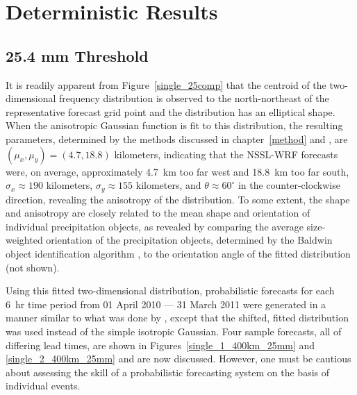 

\section{Deterministic Results}
\label{dresults}


\subsection{25.4 mm Threshold}
\label{dresults_25.4mm}

It is readily apparent from \mbox{Figure \ref{single_25comp}} that the centroid of the two-dimensional frequency distribution is observed to the north-northeast of the representative forecast grid point and the distribution has an elliptical shape.
When the anisotropic Gaussian function is fit to this distribution, the resulting parameters, determined by the methods discussed in \mbox{chapter \ref{method}} and \cite{Lak2010}, are $(\mu_x, \mu_y) = (4.7, 18.8)$ kilometers, indicating that the NSSL-WRF forecasts were, on average, approximately \mbox{4.7 km} too far west and \mbox{18.8 km} too far south, $\sigma_x \approx 190$ kilometers, $\sigma_y \approx 155$ kilometers, and $\theta \approx 60^{\circ}$ in the counter-clockwise direction, revealing the anisotropy of the distribution.
To some extent, the shape and anisotropy are closely related to the mean shape and orientation of individual precipitation objects, as revealed by comparing the average size-weighted orientation of the precipitation objects, determined by the Baldwin object identification algorithm \citep{Baldwin2005}, to the orientation angle of the fitted distribution (not shown).


Using this fitted two-dimensional distribution, probabilistic forecasts for each \mbox{6 hr} time period from 01 April 2010 --- 31 March 2011 were generated in a manner similar to what was done by \cite{Sobash2011}, except that the shifted, fitted distribution was used instead of the simple isotropic Gaussian.
Four sample forecasts, all of differing lead times, are shown in \mbox{Figures \ref{single_1_400km_25mm}} and \ref{single_2_400km_25mm} and are now discussed.
However, one must be cautious about assessing the skill of a probabilistic forecasting system on the basis of individual events.


